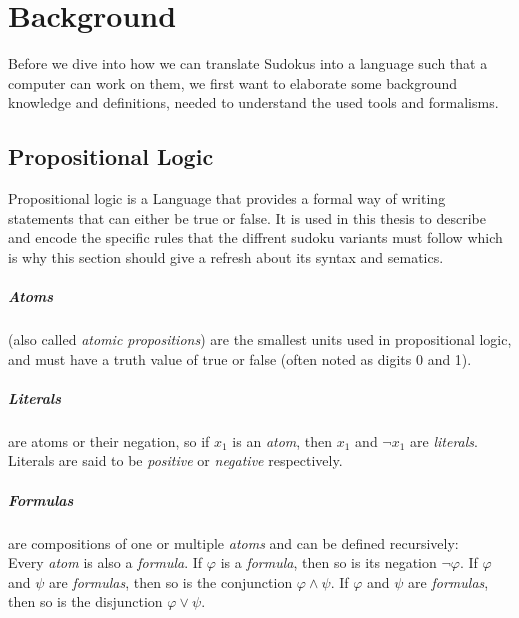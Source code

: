 
\chapter{Background}
Before we dive into how we can translate Sudokus into a language such that a computer can work on them, we first want to elaborate some background knowledge and definitions, needed to understand the used tools and formalisms.

\section{Propositional Logic}
Propositional logic is a Language that provides a formal way of writing statements that can either be true or false. It is used in this thesis to describe and encode the specific rules that the diffrent sudoku variants must follow which is why this section should give a refresh about its syntax and sematics.

\paragraph{Atoms}
(also called \emph{atomic propositions}) are the smallest units used in propositional logic, and must have a truth value of true or false (often noted as digits 0 and 1).

\paragraph{Literals}
are atoms or their negation, so if $x_1$ is an \emph{atom}, then $x_1$ and $\neg x_1$ are \emph{literals}. Literals are said to be \emph{positive} or \emph{negative} respectively.


\paragraph{Formulas} are compositions of one or multiple \emph{atoms} and can be defined recursively:\\
Every \emph{atom} is also a \emph{formula}.
If $\varphi$ is a \emph{formula}, then so is its negation $\neg\varphi$.
If $\varphi$ and $\psi$ are \emph{formulas}, then so is the conjunction $\varphi \land \psi$.
If $\varphi$ and $\psi$ are \emph{formulas}, then so is the disjunction $\varphi \lor \psi$.


